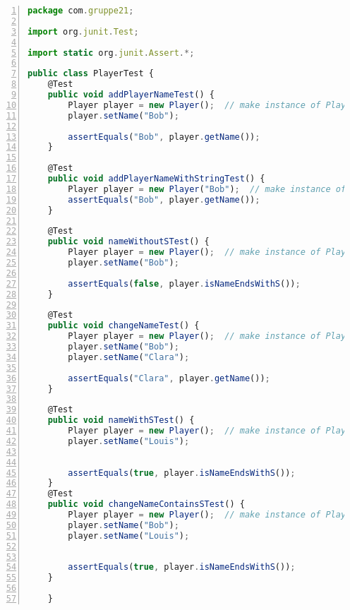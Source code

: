 \begin{lstlisting}[language=JavaScript,numbers=left]
package com.gruppe21;

import org.junit.Test;

import static org.junit.Assert.*;

public class PlayerTest {
    @Test
    public void addPlayerNameTest() {
        Player player = new Player();  // make instance of Player called player
        player.setName("Bob");

        assertEquals("Bob", player.getName());
    }

    @Test
    public void addPlayerNameWithStringTest() {
        Player player = new Player("Bob");  // make instance of Player called player
        assertEquals("Bob", player.getName());
    }

    @Test
    public void nameWithoutSTest() {
        Player player = new Player();  // make instance of Player called player
        player.setName("Bob");

        assertEquals(false, player.isNameEndsWithS());
    }

    @Test
    public void changeNameTest() {
        Player player = new Player();  // make instance of Player called player
        player.setName("Bob");
        player.setName("Clara");

        assertEquals("Clara", player.getName());
    }

    @Test
    public void nameWithSTest() {
        Player player = new Player();  // make instance of Player called player
        player.setName("Louis");


        assertEquals(true, player.isNameEndsWithS());
    }
    @Test
    public void changeNameContainsSTest() {
        Player player = new Player();  // make instance of Player called player
        player.setName("Bob");
        player.setName("Louis");


        assertEquals(true, player.isNameEndsWithS());
    }

    }
\end{lstlisting}